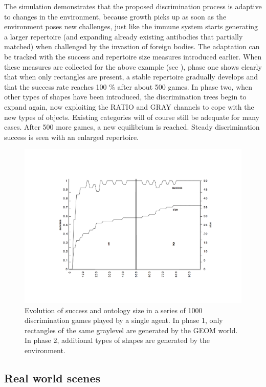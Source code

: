 The simulation demonstrates
that the proposed discrimination process is adaptive to
changes in the environment, because growth picks up
as soon as the environment poses new challenges, just 
like the immune system starts generating a larger 
repertoire (and expanding already existing antibodies
that partially matched)
when challenged by the invastion of foreign bodies. 
The adaptation can be tracked with the success and 
repertoire size measures introduced earlier. 
When these measures are collected for the above example
(see ), phase one shows clearly that 
when only rectangles are present, a stable 
repertoire gradually develops and that the success rate reaches 100 \%
after about 500 games. In phase two, when other types of 
shapes have been introduced,
the discrimination trees begin to expand again, now exploiting the
RATIO and GRAY channels to cope with the new types of objects.
Existing categories will of course still be adequate for 
many cases. After 500 more games, a new equilibrium
is reached. Steady discrimination success is seen with an 
enlarged repertoire.
\begin{figure}[htbp]
  \centerline{\includegraphics[width=.65\textwidth]{chap4/figs/adptwrlglo}}
\caption{\label{adptwrlglo} Evolution of success and ontology
size in a series of 1000 discrimination games played by a single agent.
In phase 1, only rectangles of the same graylevel are 
generated by the GEOM world. In phase 2, additional types of 
shapes are generated by the environment.}
\end{figure}

\subsection{Real world scenes}

